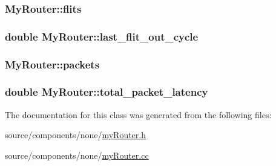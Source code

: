 \hypertarget{classMyRouter_a6cc2fffa1841027970fcdb3c948781e}{
\subsubsection[{flits}]{ {\bf MyRouter::flits}}}
\label{classMyRouter_a6cc2fffa1841027970fcdb3c948781e}


\hypertarget{classMyRouter_1b75d62cb9e51e8814704582d787b3ec}{
\subsubsection[{last\_\-flit\_\-out\_\-cycle}]{\setlength{\rightskip}{0pt plus 5cm}double {\bf MyRouter::last\_\-flit\_\-out\_\-cycle}}}
\label{classMyRouter_1b75d62cb9e51e8814704582d787b3ec}


\hypertarget{classMyRouter_32ec6983b42b6efc05af4de71055eac4}{
\subsubsection[{packets}]{ {\bf MyRouter::packets}}}
\label{classMyRouter_32ec6983b42b6efc05af4de71055eac4}


\hypertarget{classMyRouter_081915dc1164141104ffa6ce7dd05ac5}{
\subsubsection[{total\_\-packet\_\-latency}]{\setlength{\rightskip}{0pt plus 5cm}double {\bf MyRouter::total\_\-packet\_\-latency}}}
\label{classMyRouter_081915dc1164141104ffa6ce7dd05ac5}




The documentation for this class was generated from the following files:\begin{CompactItemize}
\item 
source/components/none/\hyperlink{myRouter_8h}{myRouter.h}\item 
source/components/none/\hyperlink{myRouter_8cc}{myRouter.cc}\end{CompactItemize}
